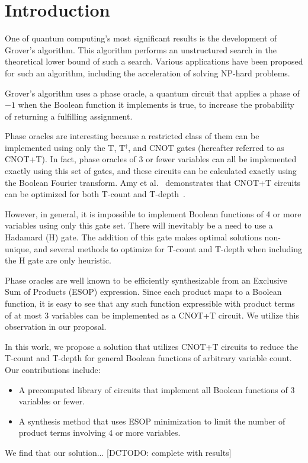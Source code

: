 \section{Introduction}
One of quantum computing's most significant results is the development of Grover's algorithm. This algorithm performs an unstructured search in the theoretical lower bound of such a search. Various applications have been proposed for such an algorithm, including the acceleration of solving NP-hard problems.

Grover's algorithm uses a phase oracle, a quantum circuit that applies a phase of $-1$ when the Boolean function it implements is true, to increase the probability of returning a fulfilling assignment.

Phase oracles are interesting because a restricted class of them can be implemented using only the T, T$^\dagger$, and CNOT gates (hereafter referred to as CNOT+T). In fact, phase oracles of 3 or fewer variables can all be implemented exactly using this set of gates, and these circuits can be calculated exactly using the Boolean Fourier transform. Amy et al.~\cite{amy-meet-in-middle} demonstrates that CNOT+T circuits can be optimized for both T-count and T-depth~\cite{bib-amy-matroid}.

However, in general, it is impossible to implement Boolean functions of 4 or more variables using only this gate set. There will inevitably be a need to use a Hadamard (H) gate. The addition of this gate makes optimal solutions non-unique, and several methods to optimize for T-count and T-depth when including the H gate are only heuristic.

Phase oracles are well known to be efficiently synthesizable from an Exclusive Sum of Products (ESOP) expression. Since each product maps to a Boolean function, it is easy to see that any such function expressible with product terms of at most 3 variables can be implemented as a CNOT+T circuit. We utilize this observation in our proposal.

In this work, we propose a solution that utilizes CNOT+T circuits to reduce the T-count and T-depth for general Boolean functions of arbitrary variable count. Our contributions include:

\begin{itemize}
    \item A precomputed library of circuits that implement all Boolean functions of 3 variables or fewer.
    \item A synthesis method that uses ESOP minimization to limit the number of product terms involving 4 or more variables.
\end{itemize}

We find that our solution... [DCTODO: complete with results]
